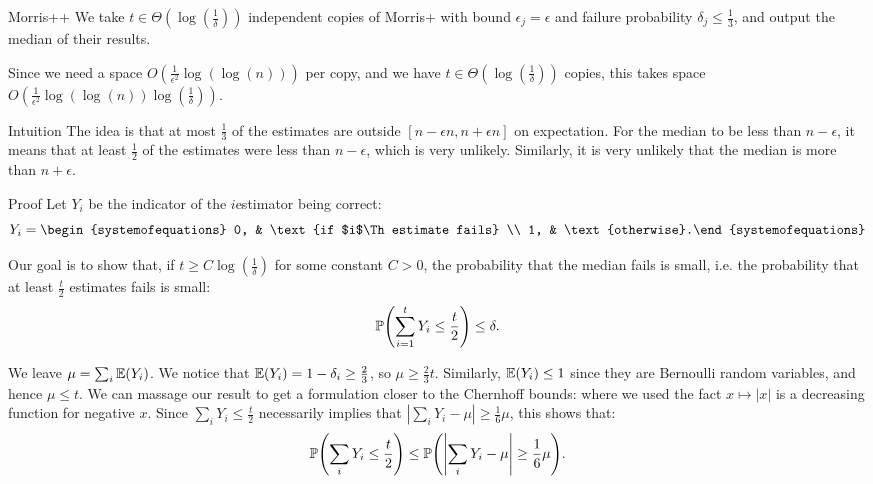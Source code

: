 \documentclass[a4paper]{article}
\begin{document}
\begin{parag}{Morris++}
    We take $t \in \Theta\left(\log\left(\frac{1}{\delta}\right)\right)$ independent copies of Morris+ with bound $\epsilon_j = \epsilon$ and failure probability $\delta_j \leq \frac{1}{3}$, and output the median of their results. 

    Since we need a space $O\left(\frac{1}{\epsilon^2} \log\left(\log\left(n\right)\right)\right)$ per copy, and we have $t\in \Theta\left(\log\left(\frac{1}{\delta}\right)\right)$ copies, this takes space $O\left(\frac{1}{\epsilon^2} \log\left(\log\left(n\right)\right) \log\left(\frac{1}{\delta}\right)\right)$.

    \begin{subparag}{Intuition}
        The idea is that at most $\frac{1}{3}$ of the estimates are outside $\left[n- \epsilon n, n + \epsilon n\right]$ on expectation. For the median to be less than $n - \epsilon$, it means that at least $\frac{1}{2}$ of the estimates were less than $n - \epsilon$, which is very unlikely. Similarly, it is very unlikely that the median is more than $n + \epsilon$.
    \end{subparag}

    \begin{subparag}{Proof}
        Let $Y_i$ be the indicator of the $i$\Th estimator being correct:
        \[Y_i = \begin{systemofequations} 0, & \text{if $i$\Th estimate fails} \\ 1, & \text{otherwise}.\end{systemofequations}\]

        Our goal is to show that, if $t \geq C \log\left(\frac{1}{\delta}\right)$ for some constant $C > 0$, the probability that the median fails is small, i.e. the probability that at least $\frac{t}{2}$ estimates fails is small: 
        \[\prob\left(\sum_{i=1}^{t} Y_i \leq \frac{t}{2}\right) \leq \delta.\]

        We leave $\mu = \sum_{i} \exval\left(Y_i\right)$. We notice that $\exval\left(Y_i\right) = 1 - \delta_i \geq \frac{2}{3}$, so $\mu \geq \frac{2}{3} t$. Similarly, $\exval\left(Y_i\right) \leq 1$ since they are Bernoulli random variables, and hence $\mu \leq t$. We can massage our result to get a formulation closer to the Chernhoff bounds: 
        where we used the fact $x \mapsto \left|x\right|$ is a decreasing function for negative $x$. Since $\sum_{i} Y_i \leq \frac{t}{2}$ necessarily implies that $\left|\sum_{i} Y_i - \mu\right| \geq \frac{1}{6} \mu$, this shows that:
        \[\prob\left(\sum_{i} Y_i \leq \frac{t}{2}\right) \leq \prob\left(\left|\sum_{i} Y_i - \mu\right| \geq \frac{1}{6} \mu\right).\]


\end{subparag}
\end{parag}
\end{document}
